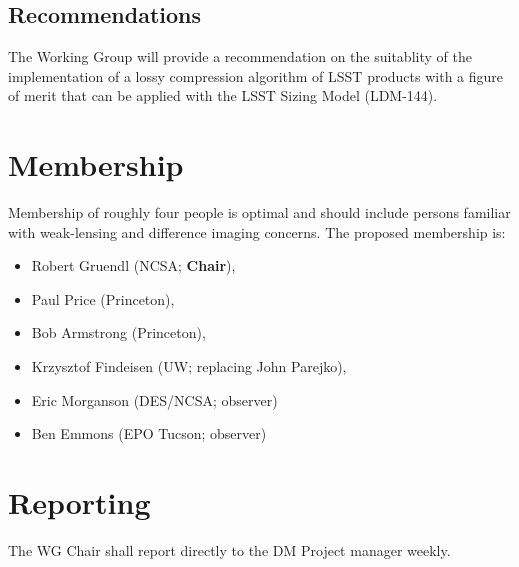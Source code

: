 \subsection{Recommendations}

The Working Group will provide a recommendation on the suitablity of the implementation
of a lossy compression algorithm of LSST products with a figure of merit that can be 
applied with the LSST Sizing Model (LDM-144).


\section{Membership}

Membership of roughly four people is optimal and should include persons familiar 
with weak-lensing and difference imaging concerns.
The proposed membership is:

\begin{itemize}
    \item Robert Gruendl (NCSA; \textbf{Chair}),
    \item Paul Price (Princeton),
    \item Bob Armstrong (Princeton),
    \item Krzysztof Findeisen (UW; replacing John Parejko),
    \item Eric Morganson (DES/NCSA; observer)
    \item Ben Emmons (EPO Tucson; observer)
\end{itemize}


\section{Reporting}

The WG Chair shall report directly to the DM Project manager weekly.
